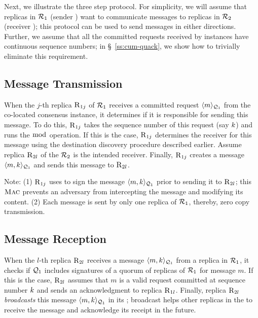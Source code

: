 Next, we illustrate the three step \Scrooge{} protocol.
For simplicity, we will assume that replicas in \RSM{} $\mathcal{R}_{1}$ (sender \RSM{}) 
want to communicate messages to replicas in \RSM{} $\mathcal{R}_{2}$ (receiver \RSM{});
this protocol can be used to send messages in either directions.
Further, we assume that all the committed requests received by \Scrooge{} instances 
have continuous sequence numbers;
in \S~\ref{ss:cum-quack}, we show how to trivially eliminate this requirement.


\subsection{Message Transmission}
\label{ss:transmit}
When the $j$-th replica $\textsc{R}_{{1}{j}}$ of \RSM{} $\mathcal{R}_{1}$ receives a committed request
$\langle m\rangle_{\mathcal{Q}_{1}}$ from the co-located consensus instance, 
it determines if it is responsible for sending this message. 
To do this, $\textsc{R}_{{1}{j}}$ takes the sequence number of this request (say $k$) 
and runs the $\bmod$ operation.
If this is the case, $\textsc{R}_{{1}{j}}$ determines the receiver for this message using 
the destination discovery procedure described earlier. 
Assume replica $\textsc{R}_{{2}{l}}$ of the \RSM{} $\mathcal{R}_{2}$ is the intended receiver.
Finally, $\textsc{R}_{{1}{j}}$ creates a message $\langle m, k\rangle_{\mathcal{Q}_{1}}$ and 
sends this message to $\textsc{R}_{{2}{l}}$.

Note: 
(1) $\textsc{R}_{{1}{j}}$ uses  to sign the message $\langle m, k\rangle_{\mathcal{Q}_{1}}$ 
prior to sending it to $\textsc{R}_{{2}{l}}$; this $\textsc{Mac}$ prevents an adversary from 
intercepting the message and modifying its content.
(2) Each message is sent by only one replica of \RSM{} $\mathcal{R}_{1}$, thereby, 
zero copy transmission.


\subsection{Message Reception}
When the $l$-th replica $\textsc{R}_{{2}{l}}$ receives a message $\langle m, k\rangle_{\mathcal{Q}_{1}}$ 
from a replica in \RSM{} $\mathcal{R}_{1}$, it checks if $\mathcal{Q}_{1}$ includes signatures of a 
quorum of replicas of \RSM{} $\mathcal{R}_{1}$ for message $m$. 
If this is the case, $\textsc{R}_{{2}{l}}$ assumes that $m$ is a valid request committed 
at sequence number $k$ and sends an acknowledgment to replica $\textsc{R}_{{1}{l}}$.
Finally, replica $\textsc{R}_{{2}{l}}$ {\em broadcasts} this message $\langle m, k\rangle_{\mathcal{Q}_{1}}$ in its \RSM{};
broadcast helps other replicas in the \RSM{} to receive the message and acknowledge 
its receipt in the future.

